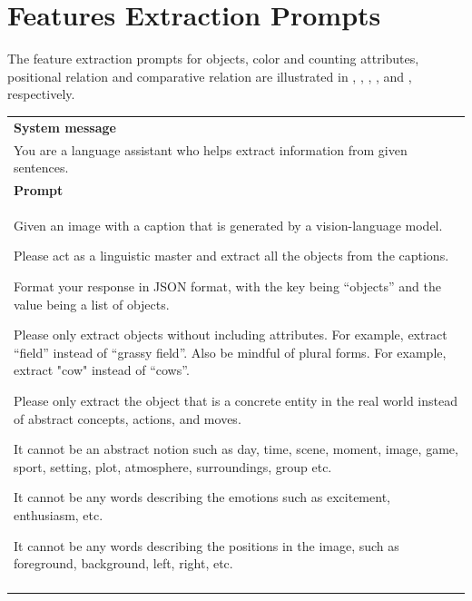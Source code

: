 \section{Features Extraction Prompts}
\label{apx:features_extraction_prompts}

The feature extraction prompts for objects, color and counting attributes, positional relation and comparative relation are illustrated in , , ,  , and  , respectively. 

\begin{table}[h!]\centering
\begin{minipage}{0.95\textwidth}   
\centering
\begin{tcolorbox} 
    \centering
    \small
    \begin{tabular}{p{}}
   { {\bf System message} } \\
    You are a language assistant who helps extract information from given sentences. \\
    \midrule
    {\bf Prompt}  \\
    Given an image with a caption that is generated by a vision-language model. 
    
    Please act as a linguistic master and extract all the objects from the captions. 
    
    Format your response in JSON format, with the key being ``objects'' and the value being a list of objects. 
        
    Please only extract objects without including attributes. For example, extract ``field'' instead of ``grassy field''. Also be mindful of plural forms. For example, extract "cow" instead of ``cows''.
    
    Please only extract the object that is a concrete entity in the real world instead of abstract concepts, actions, and moves.
    
    It cannot be an abstract notion such as day, time, scene, moment, image, game, sport, setting, plot, atmosphere, surroundings, group etc.
    
    It cannot be any words describing the emotions such as excitement, enthusiasm, etc.
    
    It cannot be any words describing the positions in the image, such as foreground, background, left, right, etc. \\\\
    

\end{tabular}
\end{tcolorbox}
\end{minipage}
\end{table}

